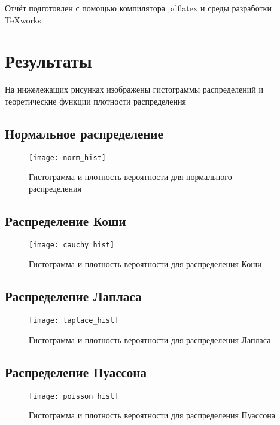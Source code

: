 Отчёт подготовлен с помощью компилятора pdflatex и среды разработки TeXworks.

\section{Результаты}
На нижележащих рисунках изображены гистограммы распределений и теоретические функции плотности распределения

\subsection{Нормальное распределение}
\begin{figure}[H]
	\begin{center}
		\texttt{[image: norm\_hist]}
		\caption{Гистограмма и плотность вероятности для нормального распределения} 
		\label{pic:pic_name}
	\end{center}
\end{figure}

\subsection{Распределение Коши}
\begin{figure}[H]
	\begin{center}
		\texttt{[image: cauchy\_hist]}
		\caption{Гистограмма и плотность вероятности для распределения Коши} 
		\label{pic:pic_name} 
	\end{center}
\end{figure}

\subsection{Распределение Лапласа}
\begin{figure}[H]
	\begin{center}
		\texttt{[image: laplace\_hist]}
		\caption{Гистограмма и плотность вероятности для распределения Лапласа} 
		\label{pic:pic_name} 
	\end{center}
\end{figure}

\subsection{Распределение Пуассона}
\begin{figure}[H]
	\begin{center}
		\texttt{[image: poisson\_hist]}
		\caption{Гистограмма и плотность вероятности для распределения Пуассона} 
		\label{pic:pic_name} 
	\end{center}
\end{figure}

